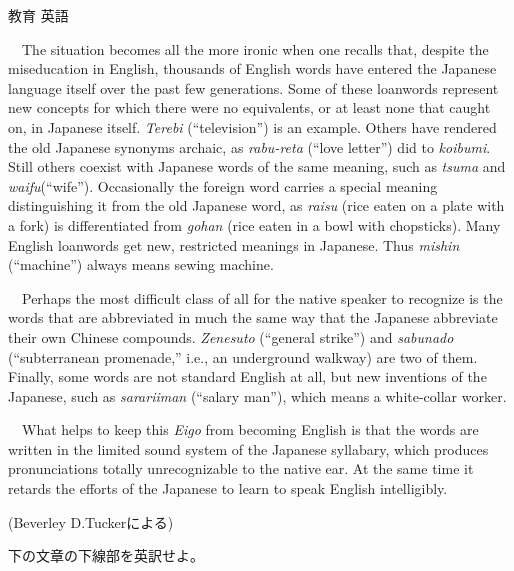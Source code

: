 \documentclass[fleqn]{jbook}
\begin{document}
\begin{question}{教育 英語}{}
\begin{subquestions}
  　The situation becomes all the more ironic when one recalls
  that, despite the miseducation in English, thousands of English
  words have entered the Japanese language itself over the past few
  generations. Some of these loanwords represent new concepts for
  which there were no equivalents, or at least none that caught on,
  in Japanese itself. {\it Terebi} (``television'') is an
  example. Others have rendered the old Japanese synonyms archaic, 
  as {\it rabu-reta} (``love letter'') did to {\it koibumi}. Still 
  others coexist with Japanese words of the same meaning, such as
  {\it tsuma} and {\it waifu}(``wife''). Occasionally the foreign word
  carries a special meaning distinguishing it from the old Japanese
  word, as {\it raisu} (rice eaten on a plate with a fork) is
  differentiated from {\it gohan} (rice eaten in a bowl with
  chopsticks). Many English loanwords get new, restricted meanings
  in Japanese. Thus {\it mishin} (``machine'') always means sewing
  machine.
 
  　Perhaps the most difficult class of all for the native speaker 
  to recognize is the words that are abbreviated in much the same
  way that the Japanese abbreviate their own Chinese compounds. {\it 
  Zenesuto} (``general strike'') and {\it sabunado} (``subterranean
  promenade,'' i.e., an underground walkway) are two of them. Finally, 
  some words are not standard English at all, but new inventions of
  the Japanese, such as {\it sarariiman} (``salary man''), which means 
  a white-collar worker.
 
  　What helps to keep this {\it Eigo} from becoming English is
  that the words are written in the limited sound system of the
  Japanese syllabary, which produces pronunciations totally
  unrecognizable to the native ear. At the same time it retards the
  efforts of the Japanese to learn to speak English
  intelligibly. 
%
  \begin{flushright}
        (Beverley D.Tuckerによる)
  \end{flushright}
\baselineskip=15pt
\SubQuestion
    下の文章の下線部を英訳せよ。


\end{subquestions}
\end{question}
\end{document}
